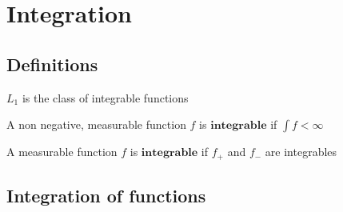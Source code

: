 \section{Integration}

\subsection{Definitions}
$L_1$ is the class of integrable functions

A non negative, measurable function $f$ is $\textbf{integrable}$ if $\int f < \infty$

A measurable function $f$ is $\textbf{integrable}$ if $f_+$ and $f_-$ are integrables 

\subsection{Integration of functions}
